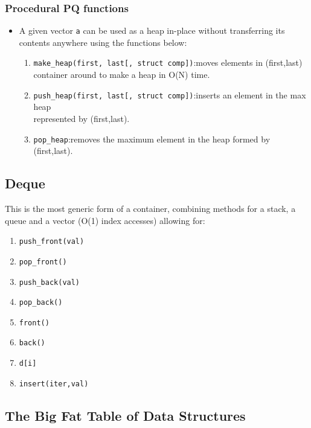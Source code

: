 \documentclass{article}
\begin{document}
\subsubsection{Procedural PQ functions}
\begin{itemize}
\item A given vector \texttt{a} can be used as a heap in-place without transferring its contents anywhere using the functions below:
\begin{enumerate}
\item \texttt{make\_heap(first, last[, struct comp])}:moves elements in (first,last) container around to make a heap in O(N) time.
\item \texttt{push\_heap(first, last[, struct comp])}:inserts an element in the max heap \\represented by (first,last).
\item \texttt{pop\_heap}:removes the maximum element in the heap formed by (first,last).
\end{enumerate}
\end{itemize}
\subsection{Deque}
This is the most generic form of a container, combining methods for a stack, a queue and a vector (O(1) index accesses) allowing for:
\begin{enumerate}
\item \texttt{push\_front(val)}
\item \texttt{pop\_front()}
\item \texttt{push\_back(val)}
\item \texttt{pop\_back()}
\item \texttt{front()}
\item \texttt{back()}
\item \texttt{d[i]}
\item \texttt{insert(iter,val)}
\end{enumerate}
\subsection{The Big Fat Table of Data Structures}

\end{document}
